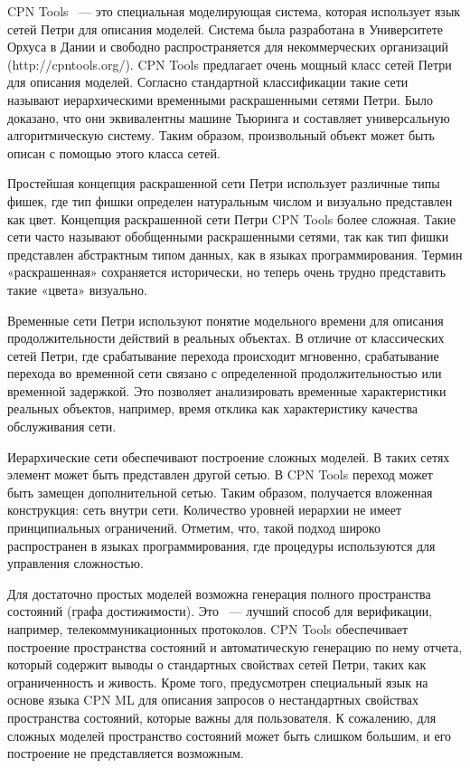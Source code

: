 CPN Tools ~--- это специальная моделирующая система, которая использует язык сетей Петри для описания моделей. Система была разработана в Университете Орхуса в Дании и свободно распространяется для некоммерческих организаций (http://cpntools.org/). CPN Tools предлагает очень мощный класс сетей Петри для описания моделей. Согласно стандартной классификации такие сети называют иерархическими временными раскрашенными сетями Петри. Было доказано, что они эквивалентны машине Тьюринга и составляет универсальную алгоритмическую систему. Таким образом, произвольный объект может быть описан с помощью этого класса сетей.

Простейшая концепция раскрашенной сети Петри использует различные типы фишек, где тип фишки определен натуральным числом и визуально представлен как цвет. Концепция раскрашенной сети Петри CPN Tools более сложная. Такие сети часто называют обобщенными раскрашенными сетями, так как тип фишки представлен абстрактным типом данных, как в языках программирования. Термин «раскрашенная» сохраняется исторически, но теперь очень трудно представить такие «цвета» визуально.

Временные сети Петри используют понятие модельного времени для описания продолжительности действий в реальных объектах. В отличие от классических сетей Петри, где срабатывание перехода происходит мгновенно, срабатывание перехода во временной сети связано с определенной продолжительностью или временной задержкой. Это позволяет анализировать временные характеристики реальных объектов, например, время отклика как характеристику качества обслуживания сети.

Иерархические сети обеспечивают построение сложных моделей. В таких сетях элемент может быть представлен другой сетью. В CPN Tools переход может быть замещен дополнительной сетью. Таким образом, получается вложенная конструкция: сеть внутри сети. Количество уровней иерархии не имеет принципиальных ограничений. Отметим, что, такой подход широко распространен в языках программирования, где процедуры используются для управления сложностью.

Для достаточно простых моделей возможна генерация полного пространства состояний (графа достижимости). Это ~--- лучший способ для верификации, например, телекоммуникационных протоколов. CPN Tools обеспечивает построение пространства состояний и автоматическую генерацию по нему отчета, который содержит выводы о стандартных свойствах сетей Петри, таких как ограниченность и живость. Кроме того, предусмотрен специальный язык на основе языка CPN ML для описания запросов о
нестандартных свойствах пространства состояний, которые важны для пользователя. К сожалению, для сложных моделей пространство состояний может быть слишком большим, и его построение не представляется возможным.

